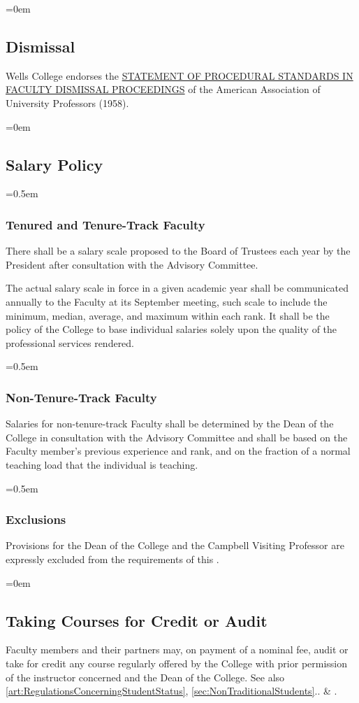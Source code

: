 \documentclass{manual}
\let\oldsubsection\subsection
\renewcommand\subsection{\leftskip=0em\oldsubsection}
\let\oldsubsubsection\subsubsection
\renewcommand\subsubsection{\leftskip=0.5em\oldsubsubsection}
\begin{document}
	\subsection{Dismissal}\label{sec:Dismissal}
	Wells College endorses the \href{http://www.aaup.org/AAUP/pubsres/policydocs/contents/statementon+proceduralstandardsinFaculty+dismissal+proceedings.htm}{STATEMENT OF PROCEDURAL STANDARDS IN FACULTY DISMISSAL PROCEEDINGS} of the American Association of University Professors (1958).

	\subsection{Salary Policy}\label{sec:SalaryPolicy}

		\subsubsection{Tenured and Tenure-Track Faculty}
		There shall be a salary scale proposed to the Board of Trustees each year by the President after consultation with the Advisory Committee.

		The actual salary scale in force in a given academic year shall be communicated annually to the Faculty at its September meeting, such scale to include the minimum, median, average, and maximum within each rank. It shall be the policy of the College to base individual salaries solely upon the quality of the professional services rendered. 

		\subsubsection{Non-Tenure-Track Faculty}
		Salaries for non-tenure-track Faculty shall be determined by the Dean of the College in consultation with the Advisory Committee and shall be based on the Faculty member's previous experience and rank, and on the fraction of a normal teaching load that the individual is teaching.

		\subsubsection{Exclusions}
		Provisions for the Dean of the College and the Campbell Visiting Professor are expressly excluded from the requirements of this .

	\subsection{Taking Courses for Credit or Audit}
	Faculty members and their partners may, on payment of a nominal fee, audit or take for credit any course regularly offered by the College with prior permission of the instructor concerned and the Dean of the College. See also \cref{art:RegulationsConcerningStudentStatus}, \cref{sec:NonTraditionalStudents}.. \& .
\end{document}
